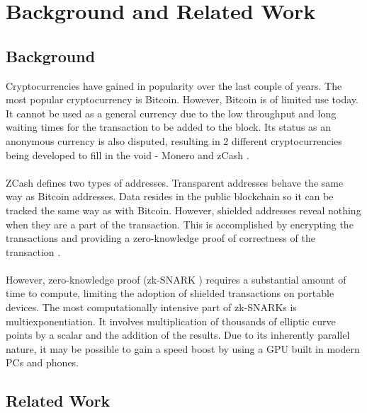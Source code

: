 
\chapter{Background and Related Work} %

\label{Chapter2} %


\section{Background}

Cryptocurrencies have gained in popularity over the last couple of years. The most popular cryptocurrency is Bitcoin. However, Bitcoin is of limited use today. It cannot be used as a general currency due to the low throughput and long waiting times for the transaction to be added to the block. Its status as an anonymous currency is also disputed, resulting in 2 different cryptocurrencies being developed to fill in the void - Monero\cite{monero} and zCash \cite{zcashprotocol}.\\
\\
ZCash defines two types of addresses. Transparent addresses behave the same way as Bitcoin addresses. Data resides in the public blockchain so it can be tracked the same way as with Bitcoin. However, shielded addresses reveal nothing when they are a part of the transaction. This is accomplished by encrypting the transactions and providing a zero-knowledge proof of correctness of the transaction \cite{zcashtechnology}.\\
\\
However, zero-knowledge proof (zk-SNARK \cite{zcashzksnarks}) requires a substantial amount of time to compute, limiting the adoption of shielded transactions on portable devices. The most computationally intensive part of zk-SNARKs is multiexponentiation. It involves multiplication of thousands of elliptic curve points by a scalar and the addition of the results. Due to its inherently parallel nature, it may be possible to gain a speed boost by using a GPU built in modern PCs and phones.



\section{Related Work}

